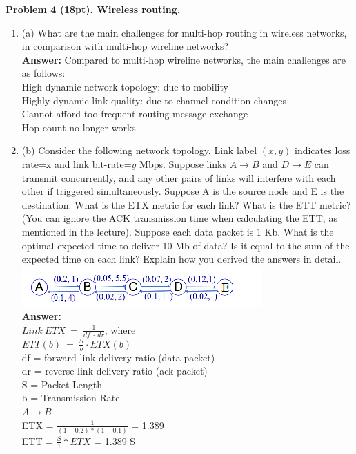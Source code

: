 \documentclass[12pt]{article}
\begin{document}
\noindent \textbf{Problem 4 (18pt). Wireless routing.\\}
\begin{enumerate}
\item (a) What are the main challenges for multi-hop routing in wireless networks, in comparison with multi-hop wireline networks?\\
\textbf{Answer:} Compared to multi-hop wireline networks, the main challenges are as follows:\\
High dynamic network topology: due to mobility\\
Highly dynamic link quality: due to channel condition changes\\
Cannot afford too frequent routing message exchange\\
Hop count no longer works
\item(b) Consider the following network topology. Link label $(x, y)$ indicates loss rate=x and link bit-rate=$y$ Mbps. Suppose links $A\rightarrow B$ and $D\rightarrow E$ can transmit concurrently, and any other pairs of links will interfere with each other if triggered simultaneously. Suppose A is the source node and E is the destination. What is the ETX metric for each link? What is the ETT metric? (You can ignore the ACK transmission time when calculating the ETT, as mentioned in the lecture). Suppose each data packet is 1 Kb. What is the optimal expected time to deliver 10 Mb of data? Is it equal to the sum of the expected time on each link? Explain how you derived the answers in detail.\\
\includegraphics[scale = 1]{HW4_Q4.png}\\
\textbf{Answer:}\\
$Link\:ETX\:=\:\frac{1}{df\:\cdot \:dr}$, where\\
$ETT\left(b\right)\:=\:\frac{S}{b}\cdot ETX\left(b\right)$\\
df = forward link delivery ratio (data packet)\\
dr = reverse link delivery ratio (ack packet)\\
S = Packet Length\\
b = Transmission Rate\\
$A\rightarrow B$\\
ETX = $\frac{1}{(1-0.2)*(1-0.1)}$ = 1.389\\
ETT = $\frac{S}{1} * ETX $ = 1.389 S\\


\end{enumerate}
\end{document}
